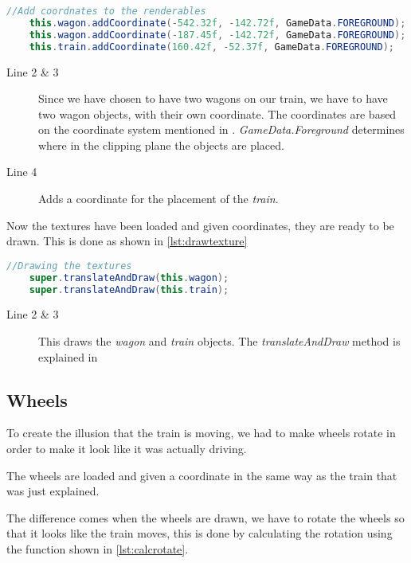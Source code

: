 \begin{lstlisting}[language=java,firstnumber=1,caption={Placing the texture on the screen},label=lst:addcoordinate] 
	//Add coordnates to the renderables
	this.wagon.addCoordinate(-542.32f, -142.72f, GameData.FOREGROUND);
	this.wagon.addCoordinate(-187.45f, -142.72f, GameData.FOREGROUND);
	this.train.addCoordinate(160.42f, -52.37f, GameData.FOREGROUND);
\end{lstlisting}

\begin{description}
\item[Line 2 \& 3] Since we have chosen to have two wagons on our train, we have to have two wagon objects, with their own coordinate. The coordinates are based on the coordinate system mentioned in . \textit{GameData.Foreground} determines where in the clipping plane the objects are placed. 
\item[Line 4] Adds a coordinate for the placement of the \textit{train}.
\end{description}

Now the textures have been loaded and given coordinates, they are ready to be drawn. This is done as shown in \autoref{lst:drawtexture}

\begin{lstlisting}[language=java,firstnumber=1,caption={Drawing the texture on the screen},label=lst:drawtexture] 
	//Drawing the textures
	super.translateAndDraw(this.wagon);
	super.translateAndDraw(this.train);
\end{lstlisting}

\begin{description}
\item[Line 2 \& 3] This draws the \textit{wagon} and \textit{train} objects. The \textit{translateAndDraw} method is explained in 
\end{description}

\subsection{Wheels}

To create the illusion that the train is moving, we had to make wheels rotate in order to make it look like it was actually driving. 

The wheels are loaded and given a coordinate in the same way as the train that was just explained.

The difference comes when the wheels are drawn, we have to rotate the wheels so that it looks like the train moves, this is done by calculating the rotation using the function shown in \autoref{lst:calcrotate}.

